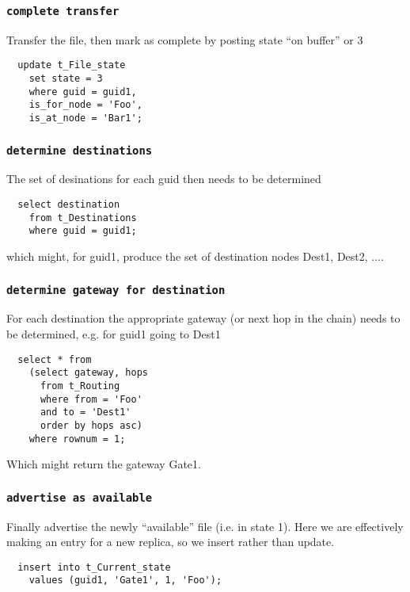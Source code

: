 \documentclass{cmspaper}
\begin{document}
\subsubsection{\textbf{\texttt{complete transfer}}}
Transfer the file, then mark as complete by posting state ``on buffer'' or 3

{\small\begin{verbatim}
  update t_File_state
    set state = 3
    where guid = guid1,
    is_for_node = 'Foo',
    is_at_node = 'Bar1';
\end{verbatim}}

\subsubsection{\textbf{\texttt{determine destinations}}}
The set of desinations for each guid then needs to be determined

{\small\begin{verbatim}
  select destination
    from t_Destinations
    where guid = guid1;
\end{verbatim}}

which might, for guid1, produce the set of destination nodes {Dest1, Dest2, ...}. 

\subsubsection{\textbf{\texttt{determine gateway for destination}}}
For each destination the appropriate gateway (or next hop in the chain) needs to be determined, e.g. for guid1 going to Dest1

{\small\begin{verbatim}
  select * from
    (select gateway, hops
      from t_Routing
      where from = 'Foo'
      and to = 'Dest1'
      order by hops asc)
    where rownum = 1;
\end{verbatim}}

Which might return the gateway Gate1. 

\subsubsection{\textbf{\texttt{advertise as available}}}
Finally advertise the newly ``available'' file (i.e. in state 1). Here we are effectively making an entry for a new replica, so we insert rather than update.

{\small\begin{verbatim}
  insert into t_Current_state
    values (guid1, 'Gate1', 1, 'Foo');
\end{verbatim}}
\end{document}
